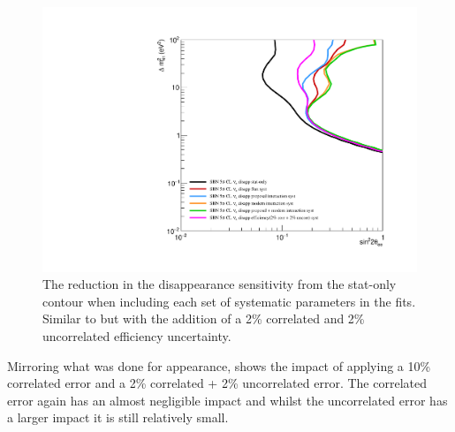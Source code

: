\begin{figure}[h!]
    \centering
    \includegraphics[width = \largefigwidth]{figures-chap6/exclusion_contours/nue_disapp_syst_groups+det.pdf}
     \caption[\nue disapp sensitivity reduction from different systematic groups with a (2+2)\% efficiency uncertainty.]{The reduction in the \nue disappearance sensitivity from the stat-only contour when including each set of systematic parameters in the fits. Similar to  but with the addition of a 2\% correlated and 2\% uncorrelated efficiency uncertainty.}
    \label{fig:nue_disapp_syst_groups_detector}
\end{figure}

Mirroring what was done for \nue appearance,  shows the impact of applying a 10\% correlated error and a 2\% correlated + 2\% uncorrelated error. The correlated error again has an almost negligible impact and whilst the uncorrelated error has a larger impact it is still relatively small. 

